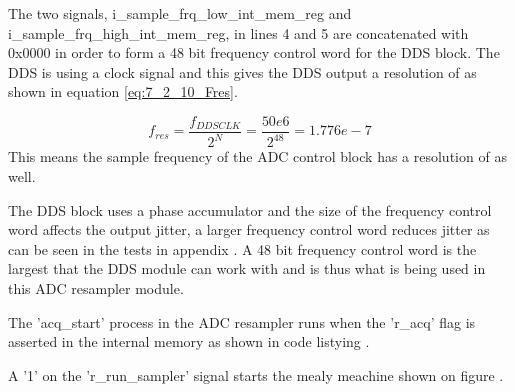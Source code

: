 

The two signals, i\_sample\_frq\_low\_int\_mem\_reg and i\_sample\_frq\_high\_int\_mem\_reg, in lines 4 and 5 are concatenated with 0x0000 in order to form a 48 bit frequency control word for the DDS block. The DDS is using a  clock signal and this gives the DDS output a resolution of  as shown in equation \ref{eq:7_2_10_Fres}.

\begin{equation}\label{eq:7_2_10_Fres}
    f_{res} = \frac{f_{DDSCLK}}{2^N} = \frac{50e6}{2^{48}} = 1.776e-7
\end{equation}
This means the sample frequency of the ADC control block has a resolution of  as well.

The DDS block uses a phase accumulator and the size of the frequency control word affects the output jitter, a larger frequency control word reduces jitter as can be seen in the tests in appendix . A 48 bit frequency control word is the largest that the DDS module can work with and is thus what is being used in this ADC resampler module.

The 'acq\_start' process in the ADC resampler runs when the 'r\_acq' flag is asserted in the internal memory as shown in code listying .



A '1' on the 'r\_run\_sampler' signal starts the mealy meachine shown on figure .

